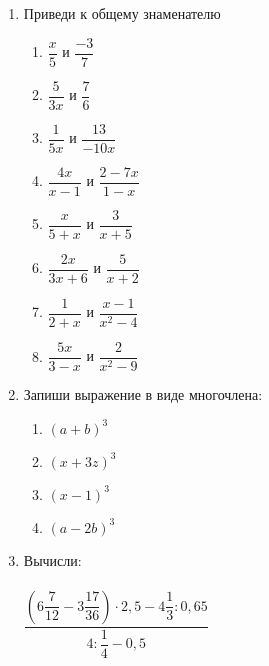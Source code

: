 \documentclass[12pt, a4paper]{article}
\begin{document}
	
 \cfoot{}
\begin{enumerate}
	\item Приведи к общему знаменателю
	\begin{multicols}{2}
		\begin{enumerate}[label=\textbf{\arabic*)}]
			\item $\dfrac{x}{5}$ и $\dfrac{-3}{7}$
			\item $\dfrac{5}{3x}$ и $\dfrac{7}{6}$
			\item $\dfrac{1}{5x}$ и $\dfrac{13}{-10x}$
			\item $\dfrac{4x}{x-1}$ и $\dfrac{2-7x}{1-x}$
			\item $\dfrac{x}{5+x}$ и $\dfrac{3}{x+5}$
			\item $\dfrac{2x}{3x+6}$ и $\dfrac{5}{x+2}$
			\item $\dfrac{1}{2+x}$ и $\dfrac{x-1}{x^2-4}$
			\item $\dfrac{5x}{3-x}$ и $\dfrac{2}{x^2-9}$
		\end{enumerate}
	\end{multicols}
	\item Запиши выражение в виде многочлена:
	\begin{multicols}{2}
		\begin{enumerate}[label=\textbf{\arabic*)}]
			\item $(a+b)^3$
			\item $(x+3z)^3$
			\item $(x-1)^3$
			\item $(a-2b)^3$
		\end{enumerate}
	\end{multicols}
	\item Вычисли: \\\\
	$\dfrac{\left( 6\dfrac{7}{12}-3\dfrac{17}{36}\right)\cdot2,5-4\dfrac{1}{3}:0,65 }{4:\dfrac{1}{4}-0,5}$
\end{enumerate}
\end{document}
